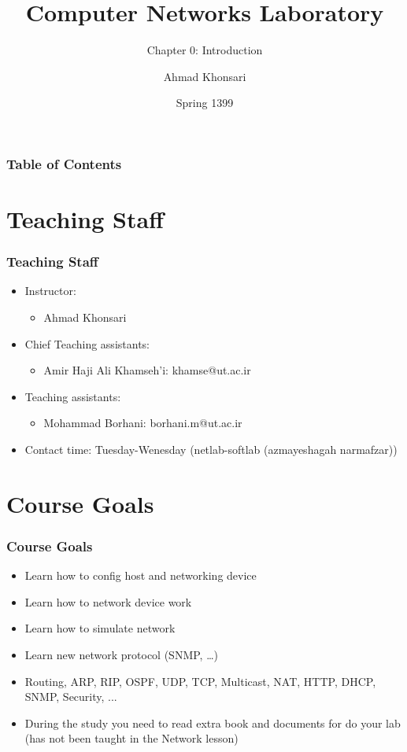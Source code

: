\documentclass[15pt]{beamer}
\title{Computer Networks Laboratory}
\subtitle{Chapter 0: Introduction}
\author{Ahmad Khonsari}
\institute{
    ECE Department\\
    Tehran University \newline
    \url{http://ece.ut.ac.ir/portal/}
}
\date{Spring 1399}
\begin{document}
\frame{\titlepage}

\begin{frame}
    \frametitle{Table of Contents}
    \tableofcontents
\end{frame}

\section{Teaching Staff}
\begin{frame}
\frametitle{Teaching Staff}
\begin{itemize}
    \item Instructor:
    \begin{itemize}
        \item Ahmad Khonsari
    \end{itemize}
    \item Chief Teaching assistants:
    \begin{itemize}
        \item Amir Haji Ali Khamseh’i: khamse@ut.ac.ir
    \end{itemize}
    \item Teaching assistants:
    \begin{itemize}
        \item Mohammad Borhani: borhani.m@ut.ac.ir
    \end{itemize}
    \item Contact time: Tuesday-Wenesday (netlab-softlab (azmayeshagah narmafzar))
\end{itemize}

\end{frame}

\section{Course Goals}
\begin{frame}
    \frametitle{Course Goals}

    \begin{itemize}
        \item Learn how to config host and networking device
        \item Learn how to network device work
        \item Learn how to simulate network
        \item Learn new network protocol (SNMP, \dots)
        \item Routing, ARP, RIP, OSPF, UDP, TCP, Multicast, NAT, HTTP, DHCP, SNMP, Security, ...         
        \item During the study you need to read extra book and documents for do your lab (has not been taught in the Network lesson)
    \end{itemize}

\end{frame}
\end{document}
